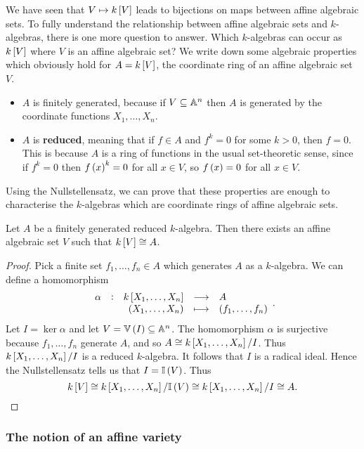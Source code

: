
We have seen that $ V \mapsto k\sbr{V} $ leads to bijections on maps between affine algebraic sets. To fully understand the relationship between affine algebraic sets and $ k $-algebras, there is one more question to answer. Which $ k $-algebras can occur as $ k\sbr{V} $ where $ V $ is an affine algebraic set? We write down some algebraic properties which obviously hold for $ A = k\sbr{V} $, the coordinate ring of an affine algebraic set $ V $.
\begin{itemize}
\item $ A $ is finitely generated, because if $ V \subseteq \AA^n $ then $ A $ is generated by the coordinate functions $ X_1, \dots, X_n $.
\item $ A $ is \textbf{reduced}, meaning that if $ f \in A $ and $ f^k = 0 $ for some $ k > 0 $, then $ f = 0 $. This is because $ A $ is a ring of functions in the usual set-theoretic sense, since if $ f^k = 0 $ then $ f\br{x}^k = 0 $ for all $ x \in V $, so $ f\br{x} = 0 $ for all $ x \in V $.
\end{itemize}
Using the Nullstellensatz, we can prove that these properties are enough to characterise the $ k $-algebras which are coordinate rings of affine algebraic sets.

\begin{proposition}
\label{prop:kva}
Let $ A $ be a finitely generated reduced $ k $-algebra. Then there exists an affine algebraic set $ V $ such that $ k\sbr{V} \cong A $.
\end{proposition}

\begin{proof}
Pick a finite set $ f_1, \dots, f_n \in A $ which generates $ A $ as a $ k $-algebra. We can define a homomorphism
$$ \function[\alpha]{k\sbr{X_1, \dots, X_n}}{A}{\br{X_1, \dots, X_n}}{\br{f_1, \dots, f_n}}. $$
Let $ I = \ker \alpha $ and let $ V = \VV\br{I} \subseteq \AA^n $. The homomorphism $ \alpha $ is surjective because $ f_1, \dots, f_n $ generate $ A $, and so $ A \cong k\sbr{X_1, \dots, X_n} / I $. Thus $ k\sbr{X_1, \dots, X_n} / I $ is a reduced $ k $-algebra. It follows that $ I $ is a radical ideal. Hence the Nullstellensatz tells us that $ I = \II\br{V} $. Thus
$$ k\sbr{V} \cong k\sbr{X_1, \dots, X_n} / \II\br{V} \cong k\sbr{X_1, \dots, X_n} / I \cong A. $$
\end{proof}

\pagebreak

\subsubsection{The notion of an affine variety}

